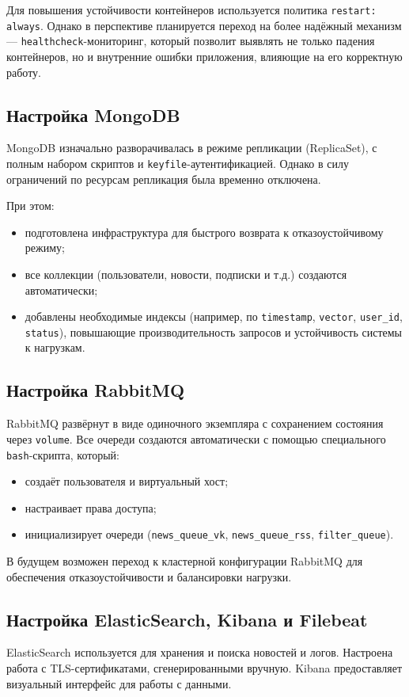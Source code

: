 Для повышения устойчивости контейнеров используется политика \texttt{restart: always}.
Однако в перспективе планируется переход на более надёжный механизм — \texttt{healthcheck}-мониторинг, который позволит выявлять не только падения контейнеров, но и внутренние ошибки приложения, влияющие на его корректную работу.

\subsection{Настройка MongoDB}
MongoDB изначально разворачивалась в режиме репликации (ReplicaSet), с полным набором скриптов и \texttt{keyfile}-аутентификацией.
Однако в силу ограничений по ресурсам репликация была временно отключена.

При этом:
\begin{itemize}
  \item подготовлена инфраструктура для быстрого возврата к отказоустойчивому режиму;
  \item все коллекции (пользователи, новости, подписки и т.д.) создаются автоматически;
  \item добавлены необходимые индексы (например, по \texttt{timestamp}, \texttt{vector}, \texttt{user\_id}, \texttt{status}), повышающие производительность запросов и устойчивость системы к нагрузкам.
\end{itemize}

\subsection{Настройка RabbitMQ}
RabbitMQ развёрнут в виде одиночного экземпляра с сохранением состояния через \texttt{volume}.
Все очереди создаются автоматически с помощью специального \texttt{bash}-скрипта, который:
\begin{itemize}
  \item создаёт пользователя и виртуальный хост;
  \item настраивает права доступа;
  \item инициализирует очереди (\texttt{news\_queue\_vk}, \texttt{news\_queue\_rss}, \texttt{filter\_queue}).
\end{itemize}

В будущем возможен переход к кластерной конфигурации RabbitMQ для обеспечения отказоустойчивости и балансировки нагрузки.

\subsection{Настройка ElasticSearch, Kibana и Filebeat}
ElasticSearch используется для хранения и поиска новостей и логов.
Настроена работа с TLS-сертификатами, сгенерированными вручную.
Kibana предоставляет визуальный интерфейс для работы с данными.


